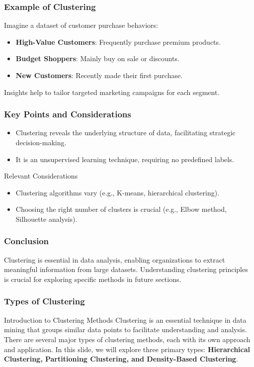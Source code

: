 \documentclass{beamer}
\begin{document}
\begin{frame}[fragile]
    \frametitle{Example of Clustering}
    Imagine a dataset of customer purchase behaviors:
    \begin{itemize}
        \item \textbf{High-Value Customers}: Frequently purchase premium products.
        \item \textbf{Budget Shoppers}: Mainly buy on sale or discounts.
        \item \textbf{New Customers}: Recently made their first purchase.
    \end{itemize}
    Insights help to tailor targeted marketing campaigns for each segment.
\end{frame}

\begin{frame}[fragile]
    \frametitle{Key Points and Considerations}
    \begin{itemize}
        \item Clustering reveals the underlying structure of data, facilitating strategic decision-making.
        \item It is an unsupervised learning technique, requiring no predefined labels.
    \end{itemize}
    
    \begin{block}{Relevant Considerations}
        \begin{itemize}
            \item Clustering algorithms vary (e.g., K-means, hierarchical clustering).
            \item Choosing the right number of clusters is crucial (e.g., Elbow method, Silhouette analysis).
        \end{itemize}
    \end{block}
\end{frame}

\begin{frame}[fragile]
    \frametitle{Conclusion}
    Clustering is essential in data analysis, enabling organizations to extract meaningful information from large datasets. Understanding clustering principles is crucial for exploring specific methods in future sections.
\end{frame}

\begin{frame}[fragile]
    \frametitle{Types of Clustering}
    \begin{block}{Introduction to Clustering Methods}
        Clustering is an essential technique in data mining that groups similar data points to facilitate understanding and analysis. There are several major types of clustering methods, each with its own approach and application. In this slide, we will explore three primary types: \textbf{Hierarchical Clustering, Partitioning Clustering, and Density-Based Clustering}.
    \end{block}
\end{frame}
\end{document}
